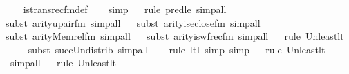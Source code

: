 \begin{isabellebody}
\ \ \isamarkupfalse%
\ is{\isacharunderscore}{\kern0pt}transrec{\isacharunderscore}{\kern0pt}fm{\isacharunderscore}{\kern0pt}def\isanewline
\ \ \isamarkupfalse%
\ simp\isanewline
\ \ \isamarkupfalse%
{\isacharparenleft}{\kern0pt}rule\ pred{\isacharunderscore}{\kern0pt}le{\isacharcomma}{\kern0pt}\ simp{\isacharunderscore}{\kern0pt}all{\isacharparenright}{\kern0pt}{\isacharplus}{\kern0pt}\isanewline
\ \ \isamarkupfalse%
{\isacharparenleft}{\kern0pt}subst\ arity{\isacharunderscore}{\kern0pt}upair{\isacharunderscore}{\kern0pt}fm{\isacharcomma}{\kern0pt}\ simp{\isacharunderscore}{\kern0pt}all{\isacharparenright}{\kern0pt}\isanewline
\ \ \isamarkupfalse%
{\isacharparenleft}{\kern0pt}subst\ arity{\isacharunderscore}{\kern0pt}is{\isacharunderscore}{\kern0pt}eclose{\isacharunderscore}{\kern0pt}fm{\isacharcomma}{\kern0pt}\ simp{\isacharunderscore}{\kern0pt}all{\isacharparenright}{\kern0pt}\isanewline
\ \ \isamarkupfalse%
{\isacharparenleft}{\kern0pt}subst\ arity{\isacharunderscore}{\kern0pt}Memrel{\isacharunderscore}{\kern0pt}fm{\isacharcomma}{\kern0pt}\ simp{\isacharunderscore}{\kern0pt}all{\isacharparenright}{\kern0pt}\isanewline
\ \ \isamarkupfalse%
{\isacharparenleft}{\kern0pt}subst\ arity{\isacharunderscore}{\kern0pt}is{\isacharunderscore}{\kern0pt}wfrec{\isacharunderscore}{\kern0pt}fm{\isacharcomma}{\kern0pt}\ simp{\isacharunderscore}{\kern0pt}all{\isacharparenright}{\kern0pt}\isanewline
\ \ \isamarkupfalse%
{\isacharparenleft}{\kern0pt}rule\ Un{\isacharunderscore}{\kern0pt}least{\isacharunderscore}{\kern0pt}lt{\isacharparenright}{\kern0pt}{\isacharplus}{\kern0pt}\isanewline
\ \ \ \ \isamarkupfalse%
{\isacharparenleft}{\kern0pt}subst\ succ{\isacharunderscore}{\kern0pt}Un{\isacharunderscore}{\kern0pt}distrib{\isacharcomma}{\kern0pt}\ simp{\isacharunderscore}{\kern0pt}all{\isacharparenright}{\kern0pt}{\isacharplus}{\kern0pt}\isanewline
\ \ \ \isamarkupfalse%
{\isacharparenleft}{\kern0pt}rule\ ltI{\isacharcomma}{\kern0pt}\ simp{\isacharcomma}{\kern0pt}\ simp{\isacharparenright}{\kern0pt}\isanewline
\ \ \isamarkupfalse%
{\isacharparenleft}{\kern0pt}rule\ Un{\isacharunderscore}{\kern0pt}least{\isacharunderscore}{\kern0pt}lt{\isacharparenright}{\kern0pt}{\isacharplus}{\kern0pt}\isanewline
\ \ \ \ \isamarkupfalse%
\ simp{\isacharunderscore}{\kern0pt}all\isanewline
\ \ \isamarkupfalse%
{\isacharparenleft}{\kern0pt}rule\ Un{\isacharunderscore}{\kern0pt}least{\isacharunderscore}{\kern0pt}lt{\isacharparenright}{\kern0pt}{\isacharplus}{\kern0pt}\isanewline

\end{isabellebody}
